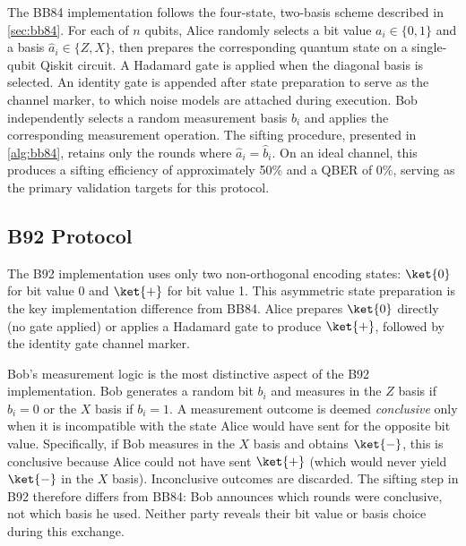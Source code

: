 The BB84 implementation follows the four-state, two-basis scheme described in \cref{sec:bb84}. For each of $n$ qubits, Alice randomly selects a bit value $a_i \in \{0,1\}$ and a basis $\hat{a}_i \in \{Z, X\}$, then prepares the corresponding quantum state on a single-qubit Qiskit circuit. A Hadamard gate is applied when the diagonal basis is selected. An identity gate is appended after state preparation to serve as the channel marker, to which noise models are attached during execution. Bob independently selects a random measurement basis $\hat{b}_i$ and applies the corresponding measurement operation. The sifting procedure, presented in \cref{alg:bb84}, retains only the rounds where $\hat{a}_i = \hat{b}_i$. On an ideal channel, this produces a sifting efficiency of approximately 50\% and a QBER of 0\%, serving as the primary validation targets for this protocol.

% 


\subsection{B92 Protocol}

The B92 implementation uses only two non-orthogonal encoding states: $\ket{0}$ for bit value 0 and $\ket{+}$ for bit value 1. This asymmetric state preparation is the key implementation difference from BB84. Alice prepares $\ket{0}$ directly (no gate applied) or applies a Hadamard gate to produce $\ket{+}$, followed by the identity gate channel marker.

Bob's measurement logic is the most distinctive aspect of the B92 implementation. Bob generates a random bit $b_i$ and measures in the $Z$ basis if $b_i = 0$ or the $X$ basis if $b_i = 1$. A measurement outcome is deemed \textit{conclusive} only when it is incompatible with the state Alice would have sent for the opposite bit value. Specifically, if Bob measures in the $X$ basis and obtains $\ket{-}$, this is conclusive because Alice could not have sent $\ket{+}$ (which would never yield $\ket{-}$ in the $X$ basis). Inconclusive outcomes are discarded. The sifting step in B92 therefore differs from BB84: Bob announces which rounds were conclusive, not which basis he used. Neither party reveals their bit value or basis choice during this exchange.

